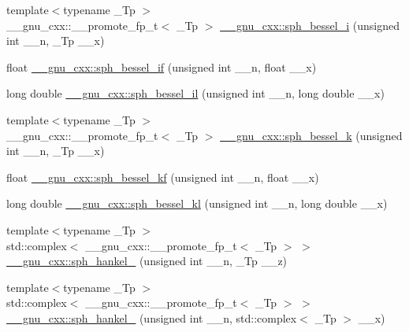 \begin{DoxyCompactItemize}
\item 
{\footnotesize template$<$typename \+\_\+\+Tp $>$ }\\\+\_\+\+\_\+gnu\+\_\+cxx\+::\+\_\+\+\_\+promote\+\_\+fp\+\_\+t$<$ \+\_\+\+Tp $>$ \hyperlink{group__gnu__math__spec__func_gad168511a86d4d25db99e2b08d5da038b}{\+\_\+\+\_\+gnu\+\_\+cxx\+::sph\+\_\+bessel\+\_\+i} (unsigned int \+\_\+\+\_\+n, \+\_\+\+Tp \+\_\+\+\_\+x)
\item 
float \hyperlink{group__gnu__math__spec__func_gacc6738f18c1ba19452b9dd814d11c00c}{\+\_\+\+\_\+gnu\+\_\+cxx\+::sph\+\_\+bessel\+\_\+if} (unsigned int \+\_\+\+\_\+n, float \+\_\+\+\_\+x)
\item 
long double \hyperlink{group__gnu__math__spec__func_gaf4392d9ed177913febdcbfccb947dbca}{\+\_\+\+\_\+gnu\+\_\+cxx\+::sph\+\_\+bessel\+\_\+il} (unsigned int \+\_\+\+\_\+n, long double \+\_\+\+\_\+x)
\item 
{\footnotesize template$<$typename \+\_\+\+Tp $>$ }\\\+\_\+\+\_\+gnu\+\_\+cxx\+::\+\_\+\+\_\+promote\+\_\+fp\+\_\+t$<$ \+\_\+\+Tp $>$ \hyperlink{group__gnu__math__spec__func_ga9ad96c43b15e2c53d2f1b743e2eaa90f}{\+\_\+\+\_\+gnu\+\_\+cxx\+::sph\+\_\+bessel\+\_\+k} (unsigned int \+\_\+\+\_\+n, \+\_\+\+Tp \+\_\+\+\_\+x)
\item 
float \hyperlink{group__gnu__math__spec__func_gaf886e8f8dfd2af0c4a9c5929d193d12f}{\+\_\+\+\_\+gnu\+\_\+cxx\+::sph\+\_\+bessel\+\_\+kf} (unsigned int \+\_\+\+\_\+n, float \+\_\+\+\_\+x)
\item 
long double \hyperlink{group__gnu__math__spec__func_ga22f6a73e50e7020a7c2fa64ce1b9be41}{\+\_\+\+\_\+gnu\+\_\+cxx\+::sph\+\_\+bessel\+\_\+kl} (unsigned int \+\_\+\+\_\+n, long double \+\_\+\+\_\+x)
\item 
{\footnotesize template$<$typename \+\_\+\+Tp $>$ }\\std\+::complex$<$ \+\_\+\+\_\+gnu\+\_\+cxx\+::\+\_\+\+\_\+promote\+\_\+fp\+\_\+t$<$ \+\_\+\+Tp $>$ $>$ \hyperlink{group__gnu__math__spec__func_ga04c91059810f366e3366fadef9084be7}{\+\_\+\+\_\+gnu\+\_\+cxx\+::sph\+\_\+hankel\+\_} (unsigned int \+\_\+\+\_\+n, \+\_\+\+Tp \+\_\+\+\_\+z)
\item 
{\footnotesize template$<$typename \+\_\+\+Tp $>$ }\\std\+::complex$<$ \+\_\+\+\_\+gnu\+\_\+cxx\+::\+\_\+\+\_\+promote\+\_\+fp\+\_\+t$<$ \+\_\+\+Tp $>$ $>$ \hyperlink{group__gnu__math__spec__func_ga931f55fae4db5194ac96330908cba3f0}{\+\_\+\+\_\+gnu\+\_\+cxx\+::sph\+\_\+hankel\+\_} (unsigned int \+\_\+\+\_\+n, std\+::complex$<$ \+\_\+\+Tp $>$ \+\_\+\+\_\+x)

\end{DoxyCompactItemize}
